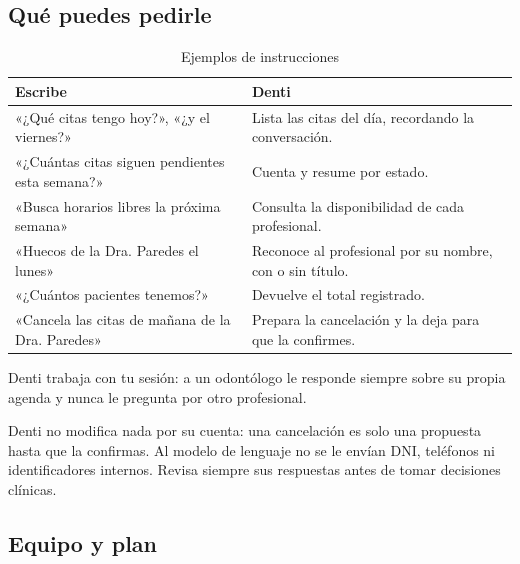 \documentclass[11pt]{article}
\begin{document}
\subsection{Qué puedes pedirle}

\begin{table}[H]
\centering\small
\caption{Ejemplos de instrucciones}\label{tab:denti}
\begin{tabularx}{\linewidth}{@{}P{6.4cm}L@{}}
\toprule
\textbf{Escribe} & \textbf{Denti} \\
\midrule
«¿Qué citas tengo hoy?», «¿y el viernes?» & Lista las citas del día, recordando la conversación. \\
«¿Cuántas citas siguen pendientes esta semana?» & Cuenta y resume por estado. \\
«Busca horarios libres la próxima semana» & Consulta la disponibilidad de cada profesional. \\
«Huecos de la Dra. Paredes el lunes» & Reconoce al profesional por su nombre, con o sin título. \\
«¿Cuántos pacientes tenemos?» & Devuelve el total registrado. \\
«Cancela las citas de mañana de la Dra. Paredes» & Prepara la cancelación y la deja para que la confirmes. \\
\bottomrule
\end{tabularx}
\end{table}

\begin{sdpermiso}
Denti trabaja con tu sesión: a un odontólogo le responde siempre sobre su propia agenda y nunca le pregunta por otro profesional.
\end{sdpermiso}

\begin{sdaviso}
Denti no modifica nada por su cuenta: una cancelación es solo una propuesta hasta que la confirmas. Al modelo de lenguaje no se le envían DNI, teléfonos ni identificadores internos. Revisa siempre sus respuestas antes de tomar decisiones clínicas.
\end{sdaviso}

\label{sec:equipo}


\subsection{Equipo y plan}
\end{document}
